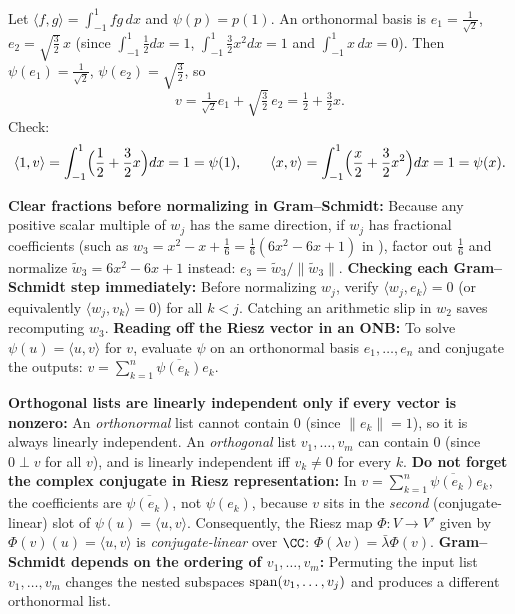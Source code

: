 \documentclass[10pt]{scrartcl}
\newcommand{\ip}[2]{\langle #1,#2\rangle}
\begin{document}
\begin{example*}[Evaluation at $1$ on $\PP_1(\RR)$]
  Let $\ip fg=\int_{-1}^1fg\,dx$ and $\psi(p)=p(1)$. An orthonormal basis is $e_1=\frac1{\sqrt2}$, $e_2=\sqrt{\frac32}\,x$ (since $\int_{-1}^1\frac12dx=1$, $\int_{-1}^1\frac32x^2dx=1$ and $\int_{-1}^1x\,dx=0$). Then $\psi(e_1)=\frac1{\sqrt2}$, $\psi(e_2)=\sqrt{\frac32}$, so
  \[ v=\tfrac1{\sqrt2}e_1+\sqrt{\tfrac32}\,e_2=\tfrac12+\tfrac32x. \]
  Check:
  \[ \ip1v=\int_{-1}^1\Bigl(\frac12+\frac32x\Bigr)dx=1=\psi(1),\qquad\ip xv=\int_{-1}^1\Bigl(\frac x2+\frac32x^2\Bigr)dx=1=\psi(x). \]
\end{example*}

\begin{shortcuts}
  \ii \textbf{Clear fractions before normalizing in Gram--Schmidt:} Because any positive scalar multiple of $w_j$ has the same direction, if $w_j$ has fractional coefficients (such as $w_3=x^2-x+\frac{1}{6}=\frac{1}{6}(6x^2-6x+1)$ in ), factor out $\frac{1}{6}$ and normalize $\widetilde w_3=6x^2-6x+1$ instead: $e_3=\widetilde w_3/\|\widetilde w_3\|$.
  \ii \textbf{Checking each Gram--Schmidt step immediately:} Before normalizing $w_j$, verify $\ip{w_j}{e_k}=0$ (or equivalently $\ip{w_j}{v_k}=0$) for all $k<j$. Catching an arithmetic slip in $w_2$ saves recomputing $w_3$.
  \ii \textbf{Reading off the Riesz vector in an ONB:} To solve $\psi(u)=\ip uv$ for $v$, evaluate $\psi$ on an orthonormal basis $e_1,\dots,e_n$ and conjugate the outputs: $v=\sum_{k=1}^n\overline{\psi(e_k)}e_k$.
\end{shortcuts}

\begin{trapbox}
  \ii \textbf{Orthogonal lists are linearly independent only if every vector is nonzero:} An \emph{orthonormal} list cannot contain $0$ (since $\|e_k\|=1$), so it is always linearly independent. An \emph{orthogonal} list $v_1,\dots,v_m$ can contain $0$ (since $0\perp v$ for all $v$), and is linearly independent iff $v_k\ne 0$ for every $k$.
  \ii \textbf{Do not forget the complex conjugate in Riesz representation:} In $v=\sum_{k=1}^n\overline{\psi(e_k)}e_k$, the coefficients are $\overline{\psi(e_k)}$, not $\psi(e_k)$, because $v$ sits in the \emph{second} (conjugate-linear) slot of $\psi(u)=\ip uv$. Consequently, the Riesz map $\Phi\colon V\to V'$ given by $\Phi(v)(u)=\ip uv$ is \emph{conjugate-linear} over $\CC$: $\Phi(\lambda v)=\bar\lambda\Phi(v)$.
  \ii \textbf{Gram--Schmidt depends on the ordering of $v_1,\dots,v_m$:} Permuting the input list $v_1,\dots,v_m$ changes the nested subspaces $\operatorname{span}(v_1,\dots,v_j)$ and produces a different orthonormal list.
\end{trapbox}
\end{document}

